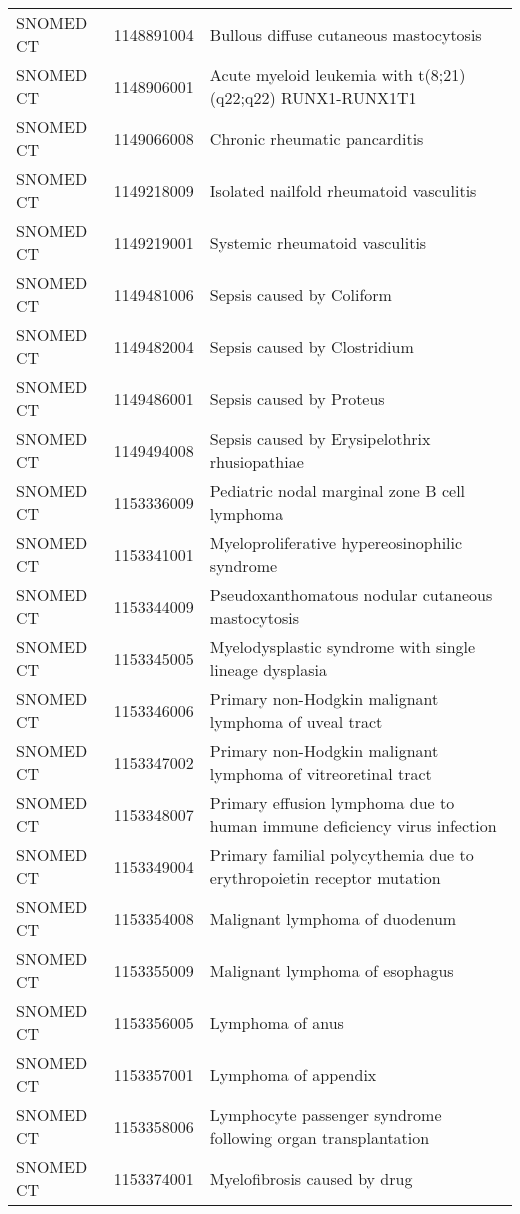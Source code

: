 \begin{longtable}{p{}p{}p{}}
  SNOMED CT & 1148891004 & Bullous diffuse cutaneous mastocytosis \\ 
  SNOMED CT & 1148906001 & Acute myeloid leukemia with t(8;21)(q22;q22) RUNX1-RUNX1T1 \\ 
  SNOMED CT & 1149066008 & Chronic rheumatic pancarditis \\ 
  SNOMED CT & 1149218009 & Isolated nailfold rheumatoid vasculitis \\ 
  SNOMED CT & 1149219001 & Systemic rheumatoid vasculitis \\ 
  SNOMED CT & 1149481006 & Sepsis caused by Coliform \\ 
  SNOMED CT & 1149482004 & Sepsis caused by Clostridium \\ 
  SNOMED CT & 1149486001 & Sepsis caused by Proteus \\ 
  SNOMED CT & 1149494008 & Sepsis caused by Erysipelothrix rhusiopathiae \\ 
  SNOMED CT & 1153336009 & Pediatric nodal marginal zone B cell lymphoma \\ 
  SNOMED CT & 1153341001 & Myeloproliferative hypereosinophilic syndrome \\ 
  SNOMED CT & 1153344009 & Pseudoxanthomatous nodular cutaneous mastocytosis \\ 
  SNOMED CT & 1153345005 & Myelodysplastic syndrome with single lineage dysplasia \\ 
  SNOMED CT & 1153346006 & Primary non-Hodgkin malignant lymphoma of uveal tract \\ 
  SNOMED CT & 1153347002 & Primary non-Hodgkin malignant lymphoma of vitreoretinal tract \\ 
  SNOMED CT & 1153348007 & Primary effusion lymphoma due to human immune deficiency virus infection \\ 
  SNOMED CT & 1153349004 & Primary familial polycythemia due to erythropoietin receptor mutation \\ 
  SNOMED CT & 1153354008 & Malignant lymphoma of duodenum \\ 
  SNOMED CT & 1153355009 & Malignant lymphoma of esophagus \\ 
  SNOMED CT & 1153356005 & Lymphoma of anus \\ 
  SNOMED CT & 1153357001 & Lymphoma of appendix \\ 
  SNOMED CT & 1153358006 & Lymphocyte passenger syndrome following organ transplantation \\ 
  SNOMED CT & 1153374001 & Myelofibrosis caused by drug \\ 

\end{longtable}
